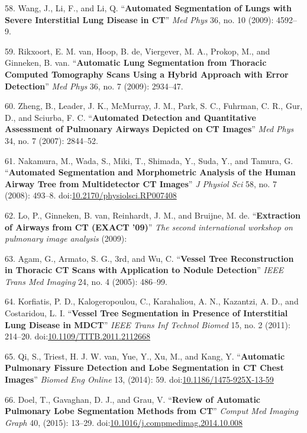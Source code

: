 \documentclass[11pt,]{article}
\begin{document}
58. Wang, J., Li, F., and Li, Q. ``\textbf{Automated Segmentation of
Lungs with Severe Interstitial Lung Disease in CT}'' \emph{Med Phys} 36,
no. 10 (2009): 4592--9.

59. Rikxoort, E. M. van, Hoop, B. de, Viergever, M. A., Prokop, M., and
Ginneken, B. van. ``\textbf{Automatic Lung Segmentation from Thoracic
Computed Tomography Scans Using a Hybrid Approach with Error
Detection}'' \emph{Med Phys} 36, no. 7 (2009): 2934--47.

60. Zheng, B., Leader, J. K., McMurray, J. M., Park, S. C., Fuhrman, C.
R., Gur, D., and Sciurba, F. C. ``\textbf{Automated Detection and
Quantitative Assessment of Pulmonary Airways Depicted on CT Images}''
\emph{Med Phys} 34, no. 7 (2007): 2844--52.

61. Nakamura, M., Wada, S., Miki, T., Shimada, Y., Suda, Y., and Tamura,
G. ``\textbf{Automated Segmentation and Morphometric Analysis of the
Human Airway Tree from Multidetector CT Images}'' \emph{J Physiol Sci}
58, no. 7 (2008): 493--8.
doi:\href{http://dx.doi.org/10.2170/physiolsci.RP007408}{10.2170/physiolsci.RP007408}

62. Lo, P., Ginneken, B. van, Reinhardt, J. M., and Bruijne, M. de.
``\textbf{Extraction of Airways from CT (EXACT '09)}'' \emph{The second
international workshop on pulmonary image analysis} (2009):

63. Agam, G., Armato, S. G., 3rd, and Wu, C. ``\textbf{Vessel Tree
Reconstruction in Thoracic CT Scans with Application to Nodule
Detection}'' \emph{IEEE Trans Med Imaging} 24, no. 4 (2005): 486--99.

64. Korfiatis, P. D., Kalogeropoulou, C., Karahaliou, A. N., Kazantzi,
A. D., and Costaridou, L. I. ``\textbf{Vessel Tree Segmentation in
Presence of Interstitial Lung Disease in MDCT}'' \emph{IEEE Trans Inf
Technol Biomed} 15, no. 2 (2011): 214--20.
doi:\href{http://dx.doi.org/10.1109/TITB.2011.2112668}{10.1109/TITB.2011.2112668}

65. Qi, S., Triest, H. J. W. van, Yue, Y., Xu, M., and Kang, Y.
``\textbf{Automatic Pulmonary Fissure Detection and Lobe Segmentation in
CT Chest Images}'' \emph{Biomed Eng Online} 13, (2014): 59.
doi:\href{http://dx.doi.org/10.1186/1475-925X-13-59}{10.1186/1475-925X-13-59}

66. Doel, T., Gavaghan, D. J., and Grau, V. ``\textbf{Review of
Automatic Pulmonary Lobe Segmentation Methods from CT}'' \emph{Comput
Med Imaging Graph} 40, (2015): 13--29.
doi:\href{http://dx.doi.org/10.1016/j.compmedimag.2014.10.008}{10.1016/j.compmedimag.2014.10.008}
\end{document}
